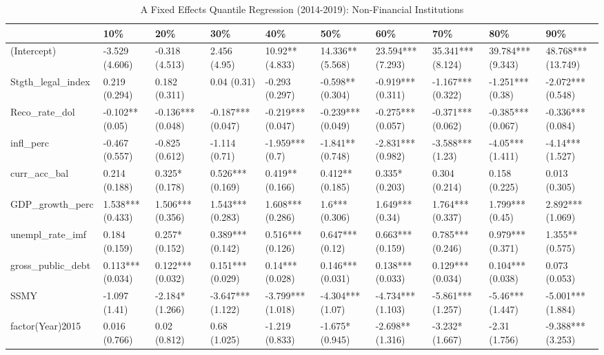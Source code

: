 \begin{table}[ht]
\centering
\caption{A Fixed Effects Quantile Regression (2014-2019): Non-Financial Institutions} 
\begingroup\small
\begin{tabular}{llllllllll}
  \toprule
 & 10\% & 20\% & 30\% & 40\% & 50\% & 60\% & 70\% & 80\% & 90\% \\ 
  \midrule
(Intercept) & -3.529 (4.606) & -0.318 (4.513) & 2.456 (4.95) & 10.92** (4.833) & 14.336** (5.568) & 23.594*** (7.293) & 35.341*** (8.124) & 39.784*** (9.343) & 48.768*** (13.749) \\ 
  Stgth\_legal\_index & 0.219 (0.294) & 0.182 (0.311) & 0.04 (0.31) & -0.293 (0.297) & -0.598** (0.304) & -0.919*** (0.311) & -1.167*** (0.322) & -1.251*** (0.38) & -2.072*** (0.548) \\ 
  Reco\_rate\_dol & -0.102** (0.05) & -0.136*** (0.048) & -0.187*** (0.047) & -0.219*** (0.047) & -0.239*** (0.049) & -0.275*** (0.057) & -0.371*** (0.062) & -0.385*** (0.067) & -0.336*** (0.084) \\ 
  infl\_perc & -0.467 (0.557) & -0.825 (0.612) & -1.114 (0.71) & -1.959*** (0.7) & -1.841** (0.748) & -2.831*** (0.982) & -3.588*** (1.23) & -4.05*** (1.411) & -4.14*** (1.527) \\ 
  curr\_acc\_bal & 0.214 (0.188) & 0.325* (0.178) & 0.526*** (0.169) & 0.419** (0.166) & 0.412** (0.185) & 0.335* (0.203) & 0.304 (0.214) & 0.158 (0.225) & 0.013 (0.305) \\ 
  GDP\_growth\_perc & 1.538*** (0.433) & 1.506*** (0.356) & 1.543*** (0.283) & 1.608*** (0.286) & 1.6*** (0.306) & 1.649*** (0.34) & 1.764*** (0.337) & 1.799*** (0.45) & 2.892*** (1.069) \\ 
  unempl\_rate\_imf & 0.184 (0.159) & 0.257* (0.152) & 0.389*** (0.142) & 0.516*** (0.126) & 0.647*** (0.12) & 0.663*** (0.159) & 0.785*** (0.246) & 0.979*** (0.371) & 1.355** (0.575) \\ 
  gross\_public\_debt & 0.113*** (0.034) & 0.122*** (0.032) & 0.151*** (0.029) & 0.14*** (0.028) & 0.146*** (0.031) & 0.138*** (0.033) & 0.129*** (0.034) & 0.104*** (0.038) & 0.073 (0.053) \\ 
  SSMY & -1.097 (1.41) & -2.184* (1.266) & -3.647*** (1.122) & -3.799*** (1.018) & -4.304*** (1.07) & -4.734*** (1.103) & -5.861*** (1.257) & -5.46*** (1.447) & -5.001*** (1.884) \\ 
  factor(Year)2015 & 0.016 (0.766) & 0.02 (0.812) & 0.68 (1.025) & -1.219 (0.833) & -1.675* (0.945) & -2.698** (1.316) & -3.232* (1.667) & -2.31 (1.756) & -9.388*** (3.253) \\ 

\end{tabular}
\end{table}
